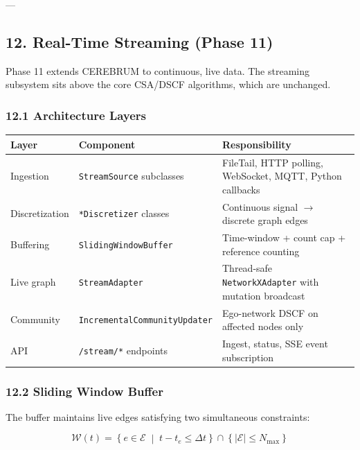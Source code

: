 \documentclass[10pt,journal,compsoc]{IEEEtran}
\begin{document}
---

\subsection{12. Real-Time Streaming (Phase 11)}

Phase 11 extends CEREBRUM to continuous, live data. The streaming subsystem
sits above the core CSA/DSCF algorithms, which are unchanged.

\subsubsection{12.1 Archit\-ecture Layers}

\begin{center}
{\footnotesize
\begin{tabularx}{\columnwidth}{|>{\raggedright\arraybackslash}X|>{\raggedright\arraybackslash}X|>{\raggedright\arraybackslash}X|}
\hline
Layer & Component & Respon\-sibility \\ \hline
Ingestion & \texttt{StreamSource} subclasses & FileTail, HTTP polling, WebSocket, MQTT, Python callbacks \\ \hline
Discre\-tization & \texttt{*Discretizer} classes & Continuous signal $\to$ discrete graph edges \\ \hline
Buffering & \texttt{SlidingWindowBuffer} & Time-window + count cap + reference counting \\ \hline
Live graph & \texttt{StreamAdapter} & Thread-safe \texttt{NetworkXAdapter} with mutation broadcast \\ \hline
Community & \texttt{IncrementalCommunityUpdater} & Ego-network DSCF on affected nodes only \\ \hline
API & \texttt{/stream/*} endpoints & Ingest, status, SSE event subsc\-ription \\ \hline
\end{tabularx}
}
\end{center}

\subsubsection{12.2 Sliding Window Buffer}

The buffer maintains live edges satisfying two simul\-taneous constraints:

\begin{equation}
\mathcal{W}(t) = \left\{ e \in \mathcal{E} \;\middle|\; t - t_e \leq \Delta t \right\} \cap \left\{ |\mathcal{E}| \leq N_{\max} \right\}
\end{equation}
\end{document}
